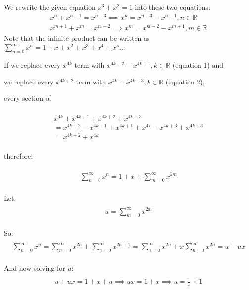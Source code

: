 \begin{enumerate}
We rewrite the given equation $x^3 + x^2 = 1$ into these two equations:
 \begin{align}  x^n + x^{n-1} = x^{n-3} \implies x^n = x^{n-3} - x^{n-1}, n \in \mathbb{R} \\ x^{m+1} + x^m = x^{m-2} \implies x^m = x^{m-2} - x^{m+1}, m \in \mathbb{R} \end{align}Note that the infinite product can be written as $\sum_{n=0}^\infty x^n = 1 + x + x^2 + x^3 + x^4 + x^5...$

 If we replace every $x^{4k}$ term with $x^{4k-2}-x^{4k+1}, k \in \mathbb{R}$ (equation 1) and

 we replace every $x^{4k+2}$ term with $x^{4k} - x^{4k+3}, k \in \mathbb{R}$ (equation 2),

 every section of

 
 \begin{align*} \\ x^{4k}+x^{4k+1}+x^{4k+2}+x^{4k+3} \\ = x^{4k-2} - x^{4k+1} + x^{4k+1} + x^{4k} - x^{4k+3} + x^{4k+3} \\ = x^{4k-2} + x^{4k} \\ \end{align*}


 therefore:

 
 \begin{align*}\\ \sum_{n=0}^\infty x^n = 1 + x + \sum_{m=0}^\infty x^{2m}\\ \end{align*}


 Let:
 \begin{align*}\\ u = \sum_{m=0}^\infty x^{2m}\\ \end{align*}


 So:
 \begin{align*}\\ \sum_{n=0}^\infty x^n = \sum_{n=0}^\infty x^{2n} + \sum_{n=0}^\infty x^{2n+1} = \sum_{n=0}^\infty x^{2n} + x \sum_{n=0}^\infty x^{2n} = u + ux\\ \end{align*}


 And now solving for $u$:
 \begin{align*}\\ u + ux = 1 + x + u \implies ux = 1+x \implies u = \frac{1}{x} + 1\\ \end{align*}



\end{enumerate}
